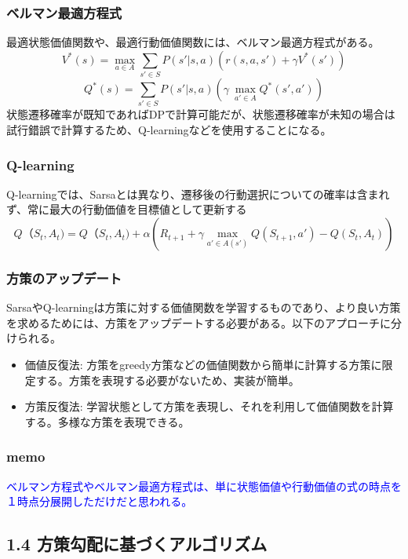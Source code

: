 \documentclass[]{jarticle}
\begin{document}
\subsubsection*{ベルマン最適方程式}
最適状態価値関数や、最適行動価値関数には、ベルマン最適方程式がある。
\begin{equation*}
V^{*}(s) = \underset{a \in A}{\max} \sum_{s'\in{S}} P(s' |s, a) (r(s,a,s') + \gamma V^{*}(s'))
\end{equation*}
\begin{equation*}
Q^{*}(s) = \sum_{s'\in{S}} P(s' |s, a) (\gamma \: \underset{a' \in A}{\max} Q^{*}(s',a'))
\end{equation*}
状態遷移確率が既知であればDPで計算可能だが、状態遷移確率が未知の場合は試行錯誤で計算するため、Q-learningなどを使用することになる。

\subsubsection*{Q-learning}
Q-learningでは、Sarsaとは異なり、遷移後の行動選択についての確率は含まれず、常に最大の行動価値を目標値として更新する
\begin{equation*}
Q（S_t, A_t) = Q（S_t, A_t) + \alpha (R_{t+1} + \gamma \underset{a' \in A(s')}{\max} Q(S_{t+1},　a') - Q(S_t, A_t))
\end{equation*}

\subsubsection*{方策のアップデート}
SarsaやQ-learningは方策に対する価値関数を学習するものであり、より良い方策を求めるためには、方策をアップデートする必要がある。以下のアプローチに分けられる。
\begin{itemize}
\item 価値反復法: 方策をgreedy方策などの価値関数から簡単に計算する方策に限定する。方策を表現する必要がないため、実装が簡単。
\item 方策反復法: 学習状態として方策を表現し、それを利用して価値関数を計算する。多様な方策を表現できる。
\end{itemize}

\subsubsection*{memo}
\textcolor{blue}{ベルマン方程式やベルマン最適方程式は、単に状態価値や行動価値の式の時点を１時点分展開しただけだと思われる。}

\subsection*{1.4 方策勾配に基づくアルゴリズム}
\end{document}
